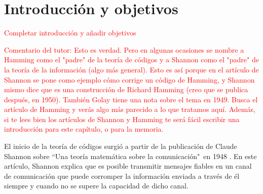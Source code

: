 \chapter*{Introducción y objetivos}


\textcolor{red}{Completar introducción y añadir objetivos}

\textcolor{red}{Comentario del tutor:}
\textcolor{red}{Esto es verdad. Pero en algunas ocasiones se nombre a Hamming como el "padre" de la teoría de códigos y a Shannon como el "padre" de la teoría de la información (algo más general). Esto es así porque en el artículo de Shannon se pone como ejemplo cómo corrige un código de Hamming, y Shannon mismo dice que es una construcción de Richard Hamming (creo que se publica después, en 1950). También Golay tiene una nota sobre el tema en 1949. Busca el artículo de Hamming y verás algo más parecido a lo que tratamos aquí. Además, si te lees bien los artículos de Shannon y Hamming te será fácil escribir una introducción para este capítulo, o para la memoria.}

El inicio de la teoría de códigos surgió a partir de la publicación de Claude Shannon sobre ``Una teoría matemática sobre la comunicación"\ en 1948 \cite{Shannon_1948}. En este artículo, Shannon explica que es posible transmitir mensajes fiables en un canal de comunicación que puede corromper la información enviada a través de él siempre y cuando no se supere la capacidad de dicho canal.

